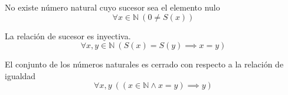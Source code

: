 

\begin{axiom} \label{nat_nosucc} No existe número  natural cuyo sucesor sea el elemento nulo 
	\begin{equation}
		\forall x \in \mathbb{N}\ (0\neq S(x))
	\end{equation}
\end{axiom}
\begin{axiom} \label{nat_inj} La relación de sucesor es inyectiva.
\begin{equation}
	\forall x,y  \in \mathbb{N}\ (S(x)=S(y)\implies x=y)
\end{equation}
\end{axiom}
\begin{axiom} \label{nat_eqclosurej} El conjunto de los números naturales es cerrado con respecto a la relación de igualdad
	\begin{equation}
		\forall x,y \ ((x \in \mathbb{N} \land x=y) \implies y )
	\end{equation}
\end{axiom}
